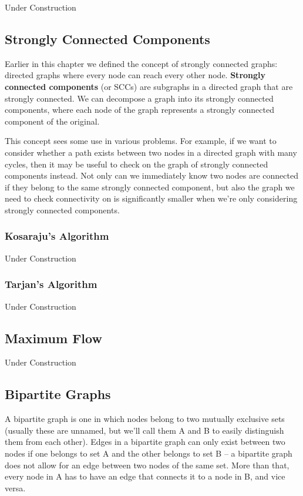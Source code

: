 Under Construction

\subsection{Strongly Connected Components}

Earlier in this chapter we defined the concept of strongly connected graphs: directed graphs where every node can reach every other node. \textbf{Strongly connected components} (or SCCs) are subgraphs in a directed graph that are strongly connected. We can decompose a graph into its strongly connected components, where each node of the graph represents a strongly connected component of the original.

This concept sees some use in various problems. For example, if we want to consider whether a path exists between two nodes in a directed graph with many cycles, then it may be useful to check on the graph of strongly connected components instead. Not only can we immediately know two nodes are connected if they belong to the same strongly connected component, but also the graph we need to check connectivity on is significantly smaller when we're only considering strongly connected components.

\subsubsection{Kosaraju's Algorithm}

Under Construction

\subsubsection{Tarjan's Algorithm}

Under Construction

\subsection{Maximum Flow}

Under Construction

\subsection{Bipartite Graphs}

A bipartite graph is one in which nodes belong to two mutually exclusive sets (usually these are unnamed, but we'll call them A and B to easily distinguish them from each other). Edges in a bipartite graph can only exist between two nodes if one belongs to set A and the other belongs to set B -- a bipartite graph does not allow for an edge between two nodes of the same set. More than that, every node in A has to have an edge that connects it to a node in B, and vice versa.

